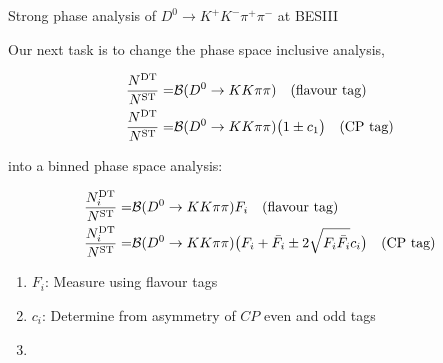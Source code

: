 \documentclass{beamer}
\begin{document}
\begin{frame}{Strong phase analysis of $D^0\to K^+K^-\pi^+\pi^-$ at BESIII}
  \begin{center}
    Our next task is to change the phase space inclusive analysis,
  \end{center}
  \vspace{-0.5cm}
  \begin{align*}
    \frac{N^{\rm DT}}{N^{\rm ST}} =& \mathcal{B}(D^0\to KK\pi\pi)\quad\textnormal{(flavour tag)} \\
    \frac{N^{\rm DT}}{N^{\rm ST}} =& \mathcal{B}(D^0\to KK\pi\pi)\big(1\pm c_1\big)\quad\textnormal{(CP tag)}
  \end{align*}
  \vspace{-1.0cm}
  \begin{center}
    into a binned phase space analysis:
  \end{center}
  \vspace{-0.6cm}
  \begin{align*}
    \frac{N^{\rm DT}_i}{N^{\rm ST}} =& \mathcal{B}(D^0\to KK\pi\pi)F_i\quad\textnormal{(flavour tag)} \\
    \frac{N^{\rm DT}_i}{N^{\rm ST}} =& \mathcal{B}(D^0\to KK\pi\pi)\big(F_i + \bar{F_i} \pm 2\sqrt{F_i\bar{F_i}}c_i\big)\quad\textnormal{(CP tag)}
  \end{align*}
  \vspace{-0.6cm}
  \begin{enumerate}
    \item{$F_i$: Measure using flavour tags}
    \item{$c_i$: Determine from asymmetry of $C\!P$ even and odd tags}
    \item[]{\phantom{$s_i$: Analogous to $c_i$, but requires binning of tag mode}}
  \end{enumerate}
  \vspace{-7.0cm}
  \begin{center}
  \end{center}
\end{frame}
\end{document}
